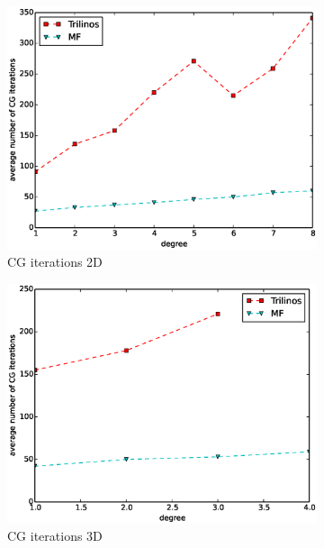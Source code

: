 \documentclass[preprint,12pt,times]{elsarticle}
\begin{document}
\begin{figure}[!ht]
\begin{subfigure}[b]{0.45\textwidth}
    \includegraphics[width=\textwidth]{Emmy_RRZE_cg2d.eps}
    \caption{CG iterations 2D}
    \label{fig:benchmark_miehe_Emmy_cg2}
  \end{subfigure}
  \begin{subfigure}[b]{0.45\textwidth}
    \centering
    \includegraphics[width=\textwidth]{Emmy_RRZE_cg3d.eps}
    \caption{CG iterations 3D}
    \label{fig:benchmark_miehe_Emmy_cg3}
  \end{subfigure}
  ~
  \begin{subfigure}[b]{0.45\textwidth}
    \centering

\end{subfigure}
\end{figure}
\end{document}

